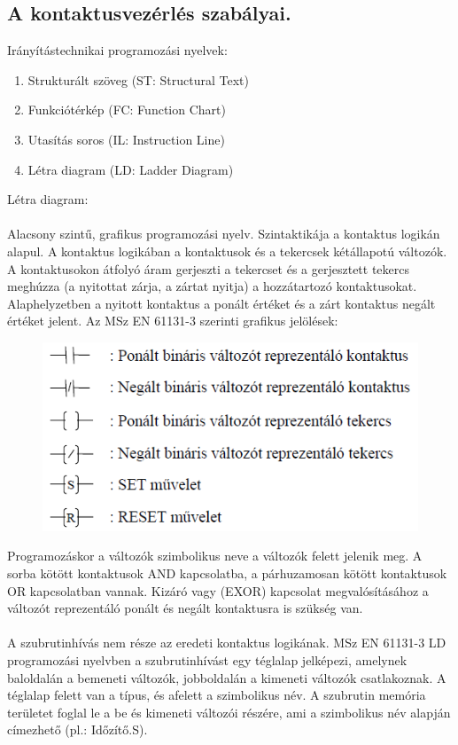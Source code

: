 \documentclass[11pt,a4paper]{article}
\begin{document}
\subsection{A kontaktusvezérlés szabályai.}
Irányítástechnikai programozási nyelvek:
\begin{enumerate}
	\item Strukturált szöveg (ST: Structural Text)
	\item Funkciótérkép (FC: Function Chart)
	\item Utasítás soros (IL: Instruction Line)
	\item Létra diagram (LD: Ladder Diagram)
\end{enumerate}
Létra diagram:\\\\
Alacsony szintű, grafikus programozási nyelv. Szintaktikája a kontaktus
logikán alapul. A kontaktus logikában a kontaktusok és a tekercsek kétállapotú
változók. A kontaktusokon átfolyó áram gerjeszti a tekercset és a gerjesztett tekercs
meghúzza (a nyitottat zárja, a zártat nyitja) a hozzátartozó kontaktusokat.
Alaphelyzetben a nyitott kontaktus a ponált értéket és a zárt kontaktus negált
értéket jelent. Az MSz EN 61131-3 szerinti grafikus jelölések:
\begin{figure}[hbtp]
    	 \centering
		\includegraphics[scale=0.8]{19_letra_jeloles.png}
		\caption{}
\end{figure}
Programozáskor a változók szimbolikus neve a változók felett jelenik
meg. A sorba kötött kontaktusok AND kapcsolatba, a párhuzamosan kötött
kontaktusok OR kapcsolatban vannak. Kizáró vagy (EXOR) kapcsolat megvalósításához
a változót reprezentáló ponált és negált kontaktusra is szükség van.\\\\
A szubrutinhívás nem része az eredeti kontaktus
logikának. MSz EN 61131-3 LD programozási
nyelvben a szubrutinhívást egy téglalap jelképezi,
amelynek baloldalán a bemeneti változók, jobboldalán a kimeneti változók csatlakoznak. A téglalap felett van a típus, és afelett a szimbolikus név. A szubrutin memória területet foglal le a be és kimeneti változói részére, ami a szimbolikus név alapján címezhető (pl.: Időzítő.S).
\end{document}
